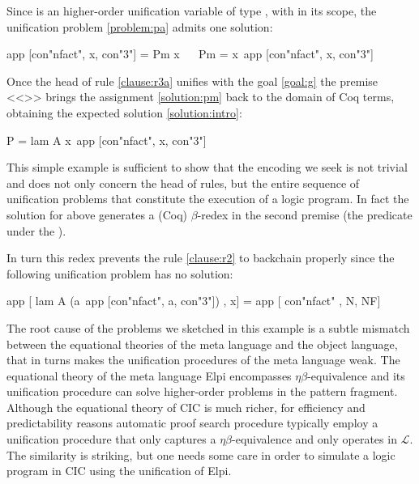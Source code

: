 \documentclass[sigconf,natbib=false,review]{acmart}
\newcommand{\llambda}{\ensuremath{\mathcal{L}}\xspace}
\begin{document}
\noindent
Since  is an higher-order unification variable
of type ,
with 
in its scope, the unification problem \ref{problem:pa}
admits one solution:

\begin{elpicode}
app [con"nfact", x, con"3"] = Pm x                    ~~
Pm = x\ app [con"nfact", x, con"3"]                   ~~
\end{elpicode}

\noindent
Once the head of rule \ref{clause:r3a} unifies with the goal \ref{goal:g}
the premise <<>> brings the assignment \ref{solution:pm}
back to the domain  of Coq terms, obtaining the expected solution
\ref{solution:intro}:

\begin{elpicode}
P = lam A x\ app [con"nfact", x, con"3"]
\end{elpicode}

\noindent
This simple example is sufficient to show that the encoding we seek
is not trivial and does not only concern the head of rules, but the entire sequence
of unification problems that constitute the execution of a logic program.
In fact
the solution for  above generates a
(Coq) $\beta$-redex in the second premise (the predicate
under the \hspace{-0.4em}).


In turn this redex prevents the rule \ref{clause:r2} to backchain properly since
the following unification problem has no solution:

\begin{elpicode}
app [ lam A (a\ app [con"nfact", a, con"3"]) , x] =
app [ con"nfact"                             , N, NF]
\end{elpicode}

\noindent
The root cause of the problems we sketched in this example
is a subtle mismatch between the equational theories of the meta language
and the object language, that in turns makes the 
unification procedures of the meta language weak.
The equational theory of the meta language Elpi encompasses
$\eta\beta$-equivalence and its unification procedure can solve higher-order
problems in the pattern fragment. Although 
the equational theory of CIC is much richer, for efficiency and predictability
reasons automatic proof search procedure typically employ a unification
procedure that only captures a $\eta\beta$-equivalence and only operates
in \llambda. The similarity is striking, but one needs some care in order to
simulate a logic program in CIC using the unification of Elpi.
\end{document}

